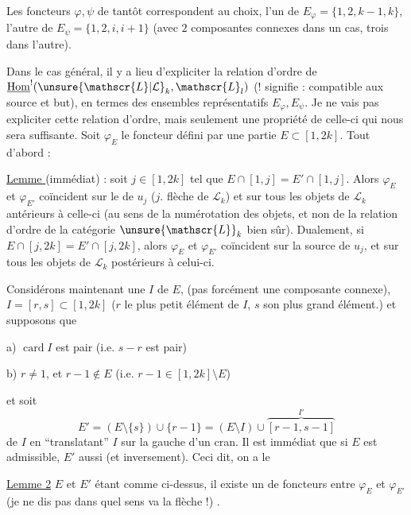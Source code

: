 Les foncteurs $\varphi,\psi$ de tantôt correspondent
au choix, l'un de $E_\varphi=\{1,2,k-1,k\}$, l'autre de
$E_\psi=\{1,2,i,i+1\}$  (avec $2$ composantes connexes
dans un cas, trois dans l'autre).

Dans le cas général, il y a lieu d'expliciter
la relation d'ordre de   $\underline{\mathrm{Hom}}^{!}(\unsure{\mathscr{L}|\mathcal{L}}_k,\mathscr{L}_l)$
($!$ signifie : compatible aux source et but), en termes
des  ensembles représentatifs $E_\varphi,E_\psi$.
Je ne vais pas expliciter cette relation d'ordre, mais
seulement une propriété de celle-ci qui nous sera
suffisante.  Soit $\varphi_E$ le foncteur défini
par une partie $E\subset[1,2k]$. Tout d'abord :

\uline{Lemme } (immédiat) :  soit $j\in[1,2k]$ tel que
$E\cap[1,j]=E'\cap[1,j]$. Alors $\varphi_E$ et $\varphi_{E'}$ coïncident sur 
le   de $u_j$ ($j$. flèche de $\mathscr{L}_k$) et sur
tous les objets de $\mathscr{L}_k$  antérieurs à celle-ci
(au sens de la numérotation des objets, et non de la
relation d'ordre de la catégorie $\unsure{\mathscr{L}}_k$ bien sûr). Dualement,
si $E\cap[j,2k]=E'\cap[j,2k]$, alors $\varphi_E$ et $\varphi_{E'}$ coïncident
sur la source de $u_j$, et sur tous les objets de $\mathscr{L}_k$ postérieurs
à celui-ci.

Considérons maintenant une  
$I$ de $E$,  (pas forcément une composante
connexe),  $I=[r,s]\subset[1,2k]$ ($r$ le plus petit élément de $I$,
$s$ son  plus grand élément.) et supposons que

a) $\operatorname{card}I$ est pair (i.e. $s-r$ est pair)

b) $r\ne1$, et $r-1\notin E$ (i.e. $r-1\in[1,2k]\setminus E$)

et soit 
\[
E'=(E\setminus\{s\})\cup\{r-1\}=(E\setminus I)\cup\overbrace{[r-1,s-1]}^{I'}
\]
 de $I$ en ``translatant'' $I$ sur la gauche d'un cran.
Il est immédiat que si $E$ est admissible, $E'$ aussi (et
inversement). Ceci dit, on a le

\uline{Lemme 2} \quad $E$ et $E'$ étant comme ci-dessus, il existe un
  de foncteurs entre $\varphi_E$ et $\varphi_{E'}$ (je ne dis
pas dans quel sens va la flèche !) \deleted{\unsure{$\leftarrow$}}.

